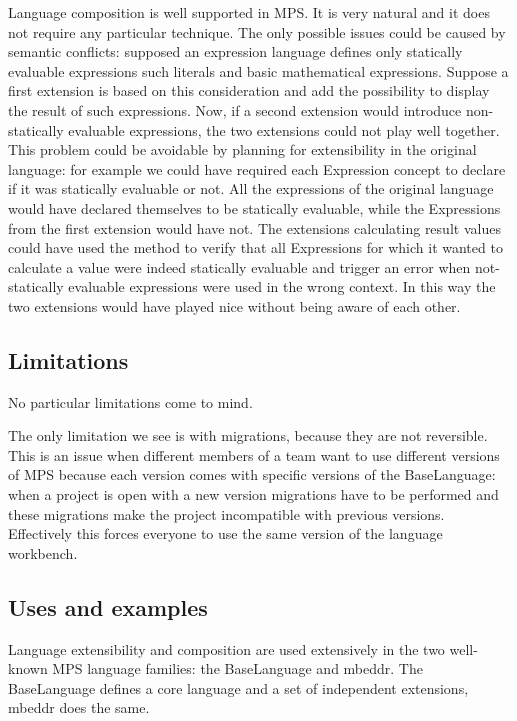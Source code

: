 \documentclass[preprint,numbers,10pt]{sigplanconf}
\begin{document}
Language composition is well supported in MPS. It is very natural and it does not require any particular technique. The only possible issues could be caused by semantic conflicts: supposed an expression language defines only statically evaluable expressions such literals and basic mathematical expressions. Suppose a first extension is based on this consideration and add the possibility to display the result of such expressions. Now, if a second extension would introduce non-statically evaluable expressions, the two extensions could not play well together. This problem could be avoidable by planning for extensibility in the original language: for example we could have required each Expression concept to declare if it was statically evaluable or not. All the expressions of the original language would have declared themselves to be statically evaluable, while the Expressions from the first extension would have not. The extensions calculating result values could have used the method to verify that all Expressions for which it wanted to calculate a value were indeed statically evaluable and trigger an error when not-statically evaluable expressions were used in the wrong context. In this way the two extensions would have played nice without being aware of each other.

\subsection{Limitations}

No particular limitations come to mind.

The only limitation we see is with migrations, because they are not reversible. This is an issue when different members of a team want to use different versions of MPS because each version comes with specific versions of the BaseLanguage: when a project is open with a new version migrations have to be performed and these migrations make the project incompatible with previous versions. Effectively this forces everyone to use the same version of the language workbench.

\subsection{Uses and examples}

Language extensibility and composition are used extensively in the two well-known MPS language families: the BaseLanguage and mbeddr. The BaseLanguage defines a core language and a set of independent extensions, mbeddr does the same.
\end{document}
